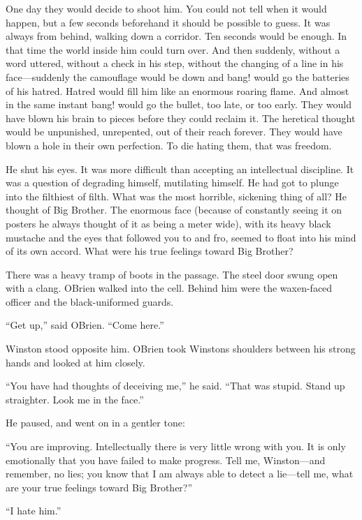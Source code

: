 One day they would decide to shoot him. You could not tell when it would
happen, but a few seconds beforehand it should be possible to guess. It
was always from behind, walking down a corridor. Ten seconds would be
enough. In that time the world inside him could turn over. And then
suddenly, without a word uttered, without a check in his step, without
the changing of a line in his face---suddenly the camouflage would be
down and bang! would go the batteries of his hatred. Hatred would fill
him like an enormous roaring flame. And almost in the same instant bang!
would go the bullet, too late, or too early. They would have blown his
brain to pieces before they could reclaim it. The heretical thought
would be unpunished, unrepented, out of their reach forever. They would
have blown a hole in their own perfection. To die hating them, that was
freedom.

He shut his eyes. It was more difficult than accepting an intellectual
discipline. It was a question of degrading himself, mutilating himself.
He had got to plunge into the filthiest of filth. What was the most
horrible, sickening thing of all? He thought of Big Brother. The
enormous face (because of constantly seeing it on posters he always
thought of it as being a meter wide), with its heavy black mustache and
the eyes that followed you to and fro, seemed to float into his mind of
its own accord. What were his true feelings toward Big Brother?

There was a heavy tramp of boots in the passage. The steel door swung
open with a clang. O\textquotesingle Brien walked into the cell. Behind
him were the waxen-faced officer and the black-uniformed guards.

``Get up,'' said O\textquotesingle Brien. ``Come here.''

Winston stood opposite him. O\textquotesingle Brien took
Winston\textquotesingle s shoulders between his strong hands and looked
at him closely.

``You have had thoughts of deceiving me,'' he said. ``That was stupid.
Stand up straighter. Look me in the face.''

He paused, and went on in a gentler tone:

``You are improving. Intellectually there is very little wrong with you.
It is only emotionally that you have failed to make progress. Tell me,
Winston---and remember, no lies; you know that I am always able to
detect a lie---tell me, what are your true feelings toward Big Brother?''

``I hate him.''

